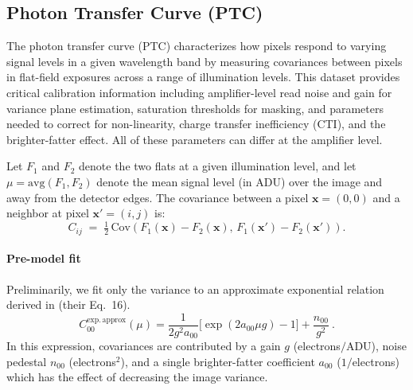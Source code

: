 \subsection{Photon Transfer Curve (PTC)} \label{sec:processing:calibration:ptc}

The photon transfer curve (PTC) characterizes how pixels respond to varying signal levels in a given wavelength band by measuring covariances between pixels in flat-field exposures across a range of illumination levels.
This dataset provides critical calibration information including amplifier-level read noise and gain for variance plane estimation, saturation thresholds for masking, and parameters needed to correct for non-linearity, charge transfer inefficiency (CTI), and the brighter-fatter effect.
All of these parameters can differ at the amplifier level.


Let $F_1$ and $F_2$ denote the two flats at a given illumination level, and let $\mu = \mathrm{avg}(F_1,F_2)$ denote the mean signal level (in ADU) over the image and away from the detector edges.
The covariance between a pixel $\mathbf{x}=(0,0)$ and a neighbor at pixel $\mathbf{x}'=(i,j)$ is:
\begin{equation}
    C_{ij} \;=\; \tfrac{1}{2}\,
    \mathrm{Cov}\!\left(F_1(\mathbf{x})-F_2(\mathbf{x}),\,
                       F_1(\mathbf{x}')-F_2(\mathbf{x}')\right).
\end{equation}


\paragraph{Pre-model fit}
Preliminarily, we fit only the variance to an approximate exponential relation derived in \citet{2019A&A...629A..36A} (their Eq.~16).
\begin{equation}
    C_{00}^{\mathrm{exp.\,approx}}(\mu) = \frac{1}{2 g^2 a_{00}}\bigl[\exp(2 a_{00} \mu g) - 1\bigr] + \frac{n_{00}}{g^2}\ .
\end{equation}
In this expression, covariances are contributed by a gain $g$ (electrons$/\mathrm{ADU}$), noise pedestal $n_{00}$ (electrons$^2$), and a single brighter-fatter coefficient $a_{00}$ ($1/$electrons) which has the effect of decreasing the image variance.

